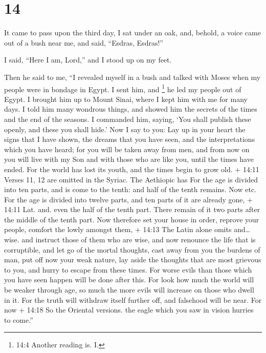 \hypertarget{section-13}{%
\section{14}\label{section-13}}

 It came to pass upon the third day, I sat under an oak,
and, behold, a voice came out of a bush near me, and said, ``Esdras,
Esdras!''

 I said, ``Here I am, Lord,'' and I stood up on my feet.

 Then he said to me, ``I revealed myself in a bush and
talked with Moses when my people were in bondage in Egypt. 
I sent him, and \footnote{14:4 Another reading is. I.} he led my people
out of Egypt. I brought him up to Mount Sinai, where I kept him with me
for many days.  I told him many wondrous things, and showed
him the secrets of the times and the end of the seasons. I commanded
him, saying,  `You shall publish these openly, and these you
shall hide.'  Now I say to you:  Lay up in your
heart the signs that I have shown, the dreams that you have seen, and
the interpretations which you have heard;  for you will be
taken away from men, and from now on you will live with my Son and with
those who are like you, until the times have ended.  For
the world has lost its youth, and the times begin to grow old.
 + 14:11 Verses 11, 12 are omitted in the Syriac. The
Aethiopic has For the age is divided into ten parts, and is come to the
tenth: and half of the tenth remains. Now etc. For the age is divided
into twelve parts, and ten parts of it are already gone, + 14:11 Lat.
and. even the half of the tenth part.  There remain of it
two parts after the middle of the tenth part.  Now
therefore set your house in order, reprove your people, comfort the
lowly amongst them, + 14:13 The Latin alone omits and\ldots wise. and
instruct those of them who are wise, and now renounce the life that is
corruptible,  and let go of the mortal thoughts, cast away
from you the burdens of man, put off now your weak nature, 
lay aside the thoughts that are most grievous to you, and hurry to
escape from these times.  For worse evils than those which
you have seen happen will be done after this.  For look how
much the world will be weaker through age, so much the more evils will
increase on those who dwell in it.  For the truth will
withdraw itself further off, and falsehood will be near. For now + 14:18
So the Oriental versions. the eagle which you saw in vision hurries to
come.''

